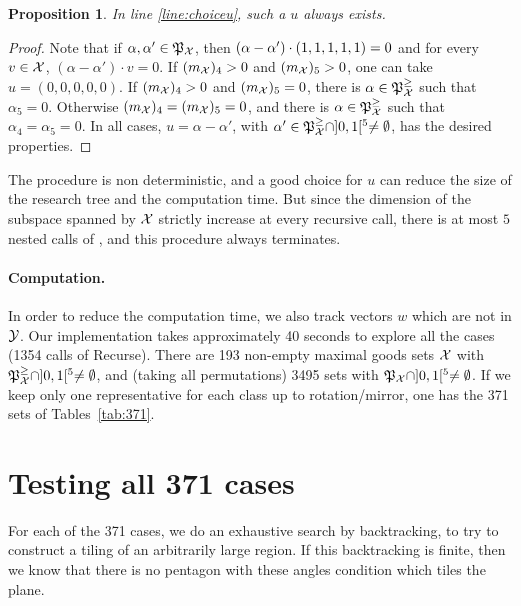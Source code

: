\documentclass[11pt]{article}
\newtheorem{proposition}[theorem]{Proposition}
\theoremstyle{definition}
\begin{document}
\begin{proposition}
  In line \ref{line:choiceu}, such a $u$  always exists.
\end{proposition}
\begin{proof}
Note that if $\alpha,\alpha'\in \mathfrak{P}_{\mathcal{X}}$, then $(\alpha-\alpha')\cdot \v1 =0$ and for every $v\in \mathcal{X}$, $(\alpha-\alpha')\cdot v =0$.
If $({m_{\mathcal{X}}})_4>0$ and $({m_{\mathcal{X}}})_5>0$, one can take $u=(0,0,0,0,0)$.
If $({m_{\mathcal{X}}})_4>0$ and $({m_{\mathcal{X}}})_5=0$, there is $\alpha\in \mathfrak{P}^\ge_{\mathcal{X}}$ such that $\alpha_5=0$. %
Otherwise $({m_{\mathcal{X}}})_4=({m_{\mathcal{X}}})_5=0$, and there is $\alpha\in \mathfrak{P}^\ge_{\mathcal{X}}$ such that $\alpha_4=\alpha_5=0$.
In all cases, $u=\alpha-\alpha'$, with $\alpha' \in \mathfrak{P}^\ge_{\mathcal{X}} \cap ]0,1[^5 \ne \emptyset$, has the desired properties.
%
\end{proof}

The procedure \textsc{\namerecproc} is non deterministic, and a good choice for $u$ can reduce the size of the research tree and the computation time.
But since the dimension of the subspace spanned by $\mathcal{X}$ strictly increase at every recursive call, there is at most $5$ nested calls of \textsc{\namerecproc}, and this procedure always terminates.
%
%
%
%
%
%
%
%
%

%
%
%
%
%
%
%
%
%
%
%
%
%
%
%
%


%
%
%
%

\paragraph{Computation.}
In order to reduce the computation time, we also track vectors $w$ which are not in $\mathcal{Y}$.
%
%
%
%
Our implementation takes approximately 40 seconds to explore all the cases (1354 calls of {\sc Recurse}).
There are 193 non-empty maximal goods sets $\mathcal{X}$ with $\mathfrak{P}^\ge_{\mathcal{X}}\cap ]0,1[^5\ne\emptyset$, and (taking all permutations) 3495 sets with $\mathfrak{P}_{\mathcal{X}}\cap ]0,1[^5\ne\emptyset$.
If we keep only one representative  for each class up to rotation/mirror, one has the 371 sets of Tables~\ref{tab:371}.

\section{Testing all 371 cases}\label{sec:phase3}

\def\azero{\emptyset}
\def\api{\pi}
\def\aunk{\operatorname{unknown}}

For each of the 371 cases, we do an exhaustive search by backtracking, to try to construct a tiling of an arbitrarily large region.
If this backtracking is finite, then we know that there is no pentagon with these angles condition which tiles the plane.
\end{document}
